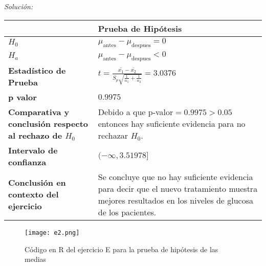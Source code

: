 \documentclass[12pt]{article}
\newenvironment{sol}
    {\emph{Solución:}
    }
    {
    }
\begin{document}
\begin{sol}
\begin{table}[h!]
\centering
\begin{tabular}{|>{\raggedright\arraybackslash}m{6cm}|>{\raggedright\arraybackslash}m{6cm}|}
\hline
 & \textbf{Prueba de Hipótesis} \\ \hline
$H_0$ & $\mu_{\text{antes}}-\mu_{\text{despues}}=0$ \\ \hline
$H_a$ & $\mu_{\text{antes}}-\mu_{\text{despues}}<0$ \\ \hline
\textbf{Estadístico de Prueba} & \vspace{0.5cm}$t=\frac{\bar{x_1}-\bar{x_2}}{S_p\sqrt{\frac{1}{n_1}+\frac{1}{n_2}}}=3.0376$\vspace{0.5cm} \\ \hline
\textbf{p valor} & $0.9975$ \\ \hline
\textbf{Comparativa y conclusión respecto al rechazo de $H_0$} & Debido a que p-valor$=0.9975>0.05$ entonces hay suficiente evidencia para no rechazar $H_0$. \\ \hline
\textbf{Intervalo de confianza} & $(-\infty, 3.51978]$ \\ \hline
\textbf{Conclusión en contexto del ejercicio} & Se concluye que no hay suficiente evidencia para decir que el nuevo tratamiento muestra mejores resultados en los niveles de glucosa de los pacientes. \\ \hline
\end{tabular}
\label{tab:hipotesis}
\end{table}
\pagebreak

\begin{figure}[h]  %
    \centering      %
    \texttt{[image: e2.png]} 
    \caption{Código en R del ejercicio E para la prueba de hipótesis de las medias}
\end{figure}


\end{sol}

\end{document}

